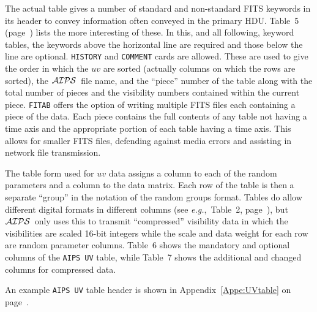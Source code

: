 \documentclass[twoside]{article}
\newcommand{\AIPS}{{$\cal AIPS\/$}}
\newcommand{\eg}{{\it e.g.},}
\begin{document}
The actual table gives a number of standard and non-standard FITS
keywords in its header to convey information often conveyed in the
primary HDU\@.  Table~5 (page~\pageref{ta:UVkeys}) lists the more
interesting of these.  In this, and all following, keyword tables, the
keywords above the horizontal line are required and those below the
line are optional. {\tt HISTORY} and {\tt COMMENT} cards are allowed.
These are used to give the order in which the $uv$ are sorted
(actually columns on which the rows are sorted), the \AIPS\ file name,
and the ``piece'' number of the table along with the total number of
pieces and the visibility numbers contained within the current piece.
{\tt FITAB} offers the option of writing multiple FITS files each
containing a piece of the data.  Each piece contains the full contents
of any table not having a time axis and the appropriate portion of
each table having a time axis.  This allows for smaller FITS files,
defending against media errors and assisting in network file
transmission.

The table form used for $uv$ data assigns a column to each of the
random parameters and a column to the data matrix.  Each row of the
table is then a separate ``group'' in the notation of the random
groups format.  Tables do allow different digital formats in different
columns (see \eg\ Table~2, page~\pageref{ta:colcodes}), but \AIPS\
only uses this to transmit ``compressed'' visibility data in which the
visibilities are scaled 16-bit integers while the scale and data
weight for each row are random parameter columns.  Table~6 shows the
mandatory and optional columns of the {\tt AIPS UV} table, while
Table~7 shows the additional and changed columns for compressed data.

An example {\tt AIPS UV} table header is shown in
Appendix~\ref{Appe:UVtable} on page~\pageref{Appe:UVtable}.
\end{document}

